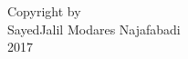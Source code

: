 


\begin{center}
\null
\vfill
\begin{doublespace}
Copyright by \\ 
SayedJalil Modares Najafabadi \\ 
2017 \\
\end{doublespace}
\end{center}
